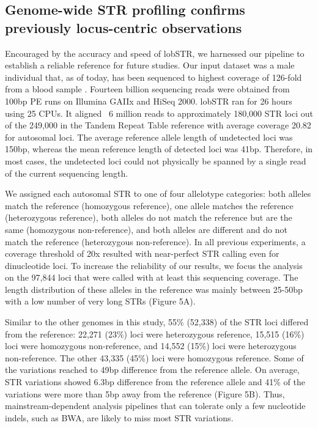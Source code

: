 \subsection{Genome-wide STR profiling confirms previously locus-centric observations}
Encouraged by the accuracy and speed of lobSTR, we harnessed our pipeline to establish a reliable reference for future studies. Our input dataset was a male individual that, as of today, has been sequenced to highest coverage of 126-fold from a blood sample \cite{AjayParkerAbaanEtAl2011}. Fourteen billion sequencing reads were obtained from 100bp PE runs on Illumina GAIIx and HiSeq 2000. lobSTR ran for 26 hours using 25 CPUs. It aligned ~6 million reads to approximately 180,000 STR loci out of the 249,000 in the Tandem Repeat Table reference with average coverage 20.82 for autosomal loci. The average reference allele length of undetected loci was 150bp, whereas the mean reference length of detected loci was 41bp. Therefore, in most cases, the undetected loci could not physically be spanned by a single read of the current sequencing length.

We assigned each autosomal STR to one of four allelotype categories: both alleles match the reference (homozygous reference), one allele matches the reference (heterozygous reference), both alleles do not match the reference but are the same (homozygous non-reference), and both alleles are different and do not match the reference (heterozygous non-reference). In all previous experiments, a coverage threshold of 20x resulted with near-perfect STR calling even for dinucleotide loci. To increase the reliability of our results, we focus the analysis on the 97,844 loci that were called with at least this sequencing coverage. The length distribution of these alleles in the reference was mainly between 25-50bp with a low number of very long STRs (Figure 5A). 

Similar to the other genomes in this study, 55\% (52,338) of the STR loci differed from the reference: 22,271 (23\%) loci were heterozygous reference, 15,515 (16\%) loci were homozygous non-reference, and 14,552 (15\%) loci were heterozygous non-reference. The other 43,335 (45\%) loci were homozygous reference. Some of the variations reached to 49bp difference from the reference allele. On average, STR variations showed 6.3bp difference from the reference allele and 41\% of the variations were more than 5bp away from the reference (Figure 5B). Thus, mainstream-dependent analysis pipelines that can tolerate only a few nucleotide indels, such as BWA, are likely to miss most STR variations.

